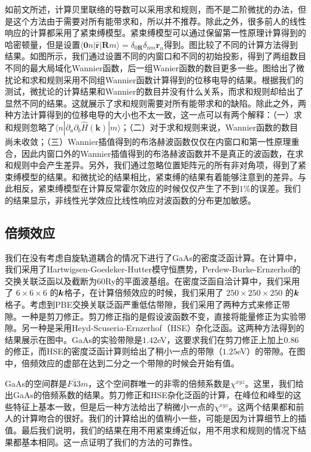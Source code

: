 如前文所述，计算贝里联络的导数可以采用求和规则，而不是二阶微扰的办法，但是这个方法由于需要对所有能带求和，所以并不推荐。除此之外，很多前人的线性响应的计算都采用了紧束缚模型。紧束缚模型可以通过保留第一性原理计算得到的哈密顿量，但是设置$\langle\mathbf{0}n|\hat{\mathbf{r}}|\mathbf{R}m\rangle=\delta_{0\mathbf{R}}\delta_{nm}\mathbf{r}_{n}$得到。图比较了不同的计算方法得到结果。如图所示，我们通过设置不同的内窗口和不同的初始投影，得到了两组数目不同的最大局域化Wannier函数，后一组Wanier函数的数目更多一些。图给出了微扰论和求和规则采用不同组Wannier函数计算得到的位移电导的结果。根据我们的测试，微扰论的计算结果和Wannier的数目并没有什么关系，而求和规则却给出了显然不同的结果。这就展示了求和规则需要对所有能带求和的缺陷。除此之外，两种方法计算得到的位移电导的大小也不太一致，这一点可以有两个解释：（一）求和规则忽略了$\langle n|\partial_{a}\partial_{b}\hat{H}(\mathbf{k})|m\rangle$；（二）对于求和规则来说，Wannier函数的数目尚未收敛；（三）Wannier插值得到的布洛赫波函数仅仅在内窗口和第一性原理重合，因此内窗口外的Wannier插值得到的布洛赫波函数并不是真正的波函数，在求和规则中会产生差异。另外，我们通过忽略位置矩阵元的所有非对角项，得到了紧束缚模型的结果。和微扰论的结果相比，紧束缚的结果有着能够注意到的差异。与此相反，紧束缚模型在计算反常霍尔效应的时候仅仅产生了不到$1\%$的误差\cite{wang_textitab_2006}。我们的结果显示，非线性光学效应比线性响应对波函数的分布更加敏感。


\subsection{倍频效应}


我们在没有考虑自旋轨道耦合的情况下进行了GaAs的密度泛函计算。在计算中，我们采用了Hartwigsen-Goedeker-Hutter模守恒赝势\cite{hartwigsen_relativistic_1998}，Perdew-Burke-Ernzerhof的交换关联泛函\cite{perdew_generalized_1996}以及截断为60Ry的平面波基组。在密度泛函自洽计算中，我们采用了 $6\times6\times6$ 的$\boldsymbol{k}$格子，在计算倍频效应的时候，我们采用了 $250\times250\times250$ 的$\boldsymbol{k}$格子。考虑到PBE交换关联泛函严重低估带隙，我们采用了两种方式来修正带隙。一种是剪刀修正\cite{nastos_scissors_2005}。剪刀修正指的是假设波函数不变，直接将能量修正为实验带隙。另一种是采用Heyd-Scuseria-Ernzerhof（HSE）杂化泛函\cite{heyd_hybrid_2003}。这两种方法得到的结果展示在图中。GaAs的实验带隙是$1.42$eV，这要求我们在剪刀修正上加上$0.86$的修正，而HSE的密度泛函计算则给出了稍小一点的带隙（$1.25$eV）的带隙。在图中，倍频效应的虚部在达到二分之一个带隙的时候会开始有值。

GaAs的空间群是$F\bar{4}3m$，这个空间群唯一的非零的倍频系数是$\chi^{xyz}$。这里，我们给出GaAs的倍频系数的结果。剪刀修正和HSE杂化泛函的计算，在峰位和峰型的这些特征上基本一致，但是后一种方法给出了稍微小一点的$\chi^{xyz}$。这两个结果都和前人的计算吻合的很好\cite{rashkeev_efficient_1998,nastos_scissors_2005,hughes_calculation_1996}。我们的计算给出的值稍小一些，可能是因为计算细节上的插值。最后我们说明，我们的结果在用不用紧束缚近似，用不用求和规则的情况下结果都基本相同。这一点证明了我们的方法的可靠性。

